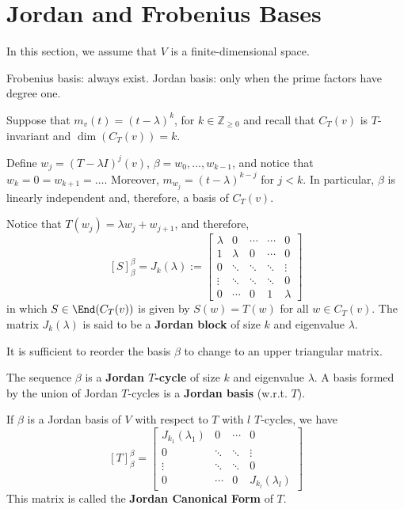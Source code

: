 \section{Jordan and Frobenius Bases}

In this section, we assume that $V$ is a finite-dimensional space.

Frobenius basis: always exist. Jordan basis: only when the prime factors have degree one.

Suppose that $m_v(t) = (t - \lambda)^k$, for $k \in \mathbb{Z}_{\geq 0}$ and recall that $C_T(v)$ is $T$-invariant and $\dim (C_T(v)) = k$.

Define $w_j = (T - \lambda I)^j (v)$, $\beta = w_0, \ldots, w_{k-1}$, and notice that $w_k = 0 = w_{k+1} = \ldots$. Moreover, $m_{w_j} = (t - \lambda)^{k-j}$ for $j < k$. In particular, $\beta$ is linearly independent and, therefore, a basis of $C_T(v)$.

Notice that $T(w_j) = \lambda w_j + w_{j+1}$, and therefore,
\[
	[S]_\beta^\beta = J_k(\lambda) := \begin{bmatrix}
		\lambda	& 0 		& \cdots 	& \cdots 	& 0 \\
		1		& \lambda 	& 0 		& \cdots 	& 0 \\
		0		& \ddots 	& \ddots 	& \ddots 	& \vdots \\
		\vdots	& \ddots	& \ddots 	& \ddots 	& 0 \\
		0		& \cdots	& 0 		& 1 		& \lambda
	\end{bmatrix}
\]
in which $S \in \End(C_T(v))$ is given by $S(w) = T(w)$ for all $w \in C_T(v)$. The matrix $J_k(\lambda)$ is said to be a \textbf{Jordan block} of size $k$ and eigenvalue $\lambda$.

It is sufficient to reorder the basis $\beta$ to change to an upper triangular matrix.

The sequence $\beta$ is a \textbf{Jordan $T$-cycle} of size $k$ and eigenvalue $\lambda$. A basis formed by the union of Jordan $T$-cycles is a \textbf{Jordan basis} (w.r.t. $T$).

If $\beta$ is a Jordan basis of $V$ with respect to $T$ with $l$ $T$-cycles, we have
\[
	[T]_\beta^\beta = \begin{bmatrix}
	J_{k_1}(\lambda_1)	& 0 	 & \cdots	& 0 \\
	0					& \ddots & \ddots	& \vdots \\
	\vdots				& \ddots & \ddots 	& 0 \\
	0					& \cdots & 0 		& J_{k_l}(\lambda_l)
	\end{bmatrix}
\]
This matrix is called the \textbf{Jordan Canonical Form} of $T$.

